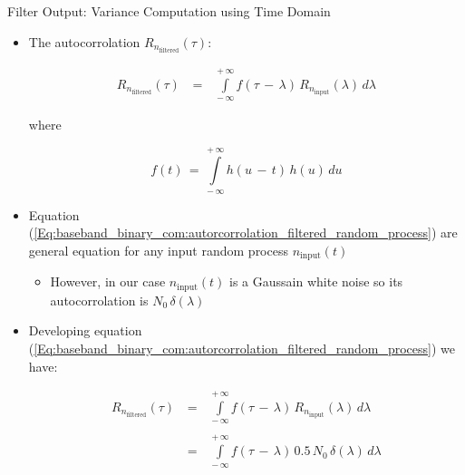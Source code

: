 \documentclass{Beamer}
\begin{document}
\begin{frame}[t,allowframebreaks]{Filter Output: Variance Computation using Time Domain}


\begin{itemize}

\item The autocorrolation $R_{n_{\text{filtered}}}(\tau)$:

\begin{equation}
\begin{array}{rcl}
R_{n_{\text{filtered}}}(\tau) \, &=& \, \displaystyle\int\limits_{- \, \infty}^{+ \, \infty} f (\tau \, - \, \lambda) \, R_{n_{\text{input}}} (\lambda) \, d\lambda
\end{array}
\label{Eq:baseband_binary_com:autorcorrolation_filtered_random_process}
\end{equation}

where 

\begin{equation}
f(t) \, = \, \displaystyle\int\limits_{- \, \infty}^{+ \, \infty} h (u \, - \, t) \, h(u) \, du
\label{Eq:baseband_binary_com:autorcorrolation_filtered_random_process_2}
\end{equation}


\item Equation (\autoref{Eq:baseband_binary_com:autorcorrolation_filtered_random_process}) are general equation for any input random process $n_{\text{input}}(t)$

	\begin{itemize}
	\item However, in our case $n_{\text{input}}(t)$ is a Gaussain white noise so its autocorrolation is $N_0 \, \delta(\lambda)$
	\end{itemize}

\item Developing equation (\autoref{Eq:baseband_binary_com:autorcorrolation_filtered_random_process}) we have:

\begin{equation}
\begin{array}{rcl}
R_{n_{\text{filtered}}}(\tau) \, &=& \, \displaystyle\int\limits_{- \, \infty}^{+ \, \infty} f (\tau \, - \, \lambda) \, R_{n_{\text{input}}} (\lambda) \, d\lambda \\ \\
	&=& \, \displaystyle\int\limits_{- \, \infty}^{+ \, \infty} f (\tau \, - \, \lambda) \, 0.5 \,  N_0 \, \delta(\lambda) \, d\lambda
\end{array}
\end{equation}


\end{itemize}
\end{frame}
\end{document}
